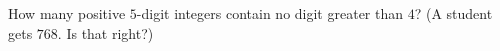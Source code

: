 How many positive $5$-digit integers contain no digit greater than $4$? (A student gets $768$. Is that right?)
